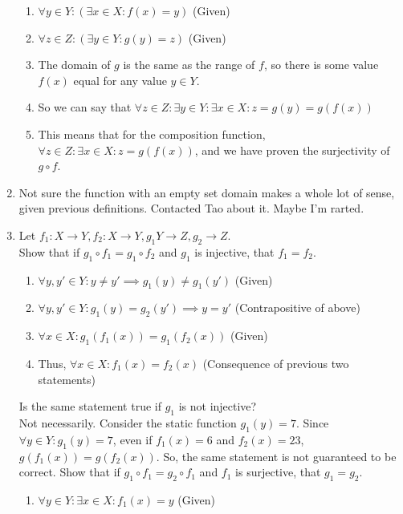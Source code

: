 \documentclass{article}
\begin{document}
\begin{enumerate}
\begin{enumerate}
                \item $\forall y \in Y: (\exists x \in X: f(x) = y)$ (Given)
                \item $\forall z \in Z: (\exists y \in Y: g(y) = z)$ (Given)
                \item The domain of $g$ is the same as the range of $f$, so there is some value $f(x)$ equal for any value $y \in Y$.
                \item So we can say that $\forall z \in Z: \exists y \in Y: \exists x \in X: z = g(y) = g(f(x))$
                \item This means that for the composition function, $\forall z \in Z: \exists x \in X: z = g(f(x))$, and we have proven the
                    surjectivity of $g \circ f$.
            \end{enumerate}
        \item Not sure the function with an empty set domain makes a whole lot of sense, given previous definitions. Contacted Tao about it. Maybe I'm rarted.
        \item Let $f_1: X \rightarrow Y, f_2: X \rightarrow Y, g_1 Y \rightarrow Z, g_2 \rightarrow Z$. \\
            Show that if $g_1 \circ f_1 = g_1 \circ f_2$ and $g_1$ is injective, that $f_1 = f_2$.
            \begin{enumerate}
                \item $\forall y,y' \in Y: y \neq y' \implies g_1(y) \neq g_1(y')$ (Given)
                \item $\forall y,y' \in Y: g_1(y) = g_2(y') \implies y = y'$ (Contrapositive of above)
                \item $\forall x \in X: g_1(f_1(x)) = g_1(f_2(x))$ (Given)
                \item Thus, $\forall x \in X: f_1(x) = f_2(x)$ (Consequence of previous two statements)
            \end{enumerate}
            Is the same statement true if $g_1$ is not injective? \\
            Not necessarily. Consider the static function $g_1(y) = 7$.
            Since $\forall y \in Y: g_1(y) = 7$, even if $f_1(x) = 6$ and
            $f_2(x) = 23$, $g(f_1(x)) = g(f_2(x))$. So, the same statement
            is not guaranteed to be correct.
            Show that if $g_1 \circ f_1 = g_2 \circ f_1$ and $f_1$ is surjective, that $g_1 = g_2$.
            \begin{enumerate}
                \item $\forall y \in Y: \exists x \in X: f_1(x) = y$ (Given)

\end{enumerate}
\end{enumerate}
\end{document}
